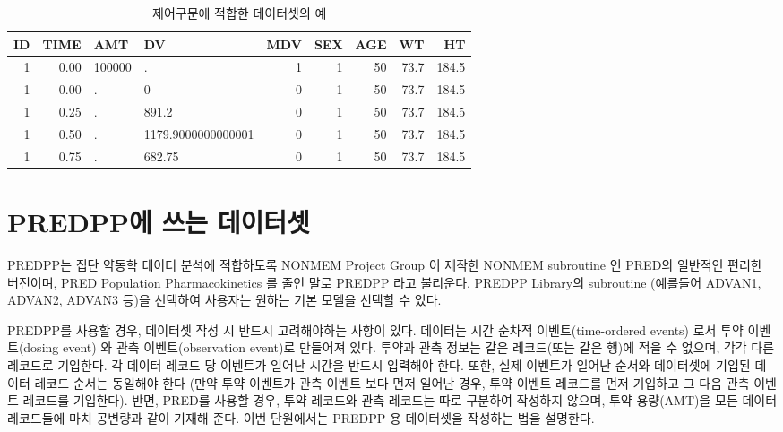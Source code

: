 \documentclass[
  10pt,
]{krantz}
\begin{document}
\begin{table}

\caption{\label{tab:tab}제어구문에 적합한 데이터셋의 예}
\centering
\begin{tabular}[t]{r|r|l|l|r|r|r|r|r}
\hline
ID & TIME & AMT & DV & MDV & SEX & AGE & WT & HT\\
\hline
1 & 0.00 & 100000 & . & 1 & 1 & 50 & 73.7 & 184.5\\
\hline
1 & 0.00 & . & 0 & 0 & 1 & 50 & 73.7 & 184.5\\
\hline
1 & 0.25 & . & 891.2 & 0 & 1 & 50 & 73.7 & 184.5\\
\hline
1 & 0.50 & . & 1179.9000000000001 & 0 & 1 & 50 & 73.7 & 184.5\\
\hline
1 & 0.75 & . & 682.75 & 0 & 1 & 50 & 73.7 & 184.5\\
\hline
\end{tabular}
\end{table}

\hypertarget{predppuxc5d0-uxc4f0uxb294-uxb370uxc774uxd130uxc14b}{%
\section{PREDPP에 쓰는 데이터셋}\label{predppuxc5d0-uxc4f0uxb294-uxb370uxc774uxd130uxc14b}}

PREDPP는 집단 약동학 데이터 분석에 적합하도록 NONMEM Project Group 이 제작한 NONMEM subroutine 인 PRED의 일반적인 편리한 버전이며, PRED Population Pharmacokinetics 를 줄인 말로 PREDPP 라고 불리운다. PREDPP Library의 subroutine (예를들어 ADVAN1, ADVAN2, ADVAN3 등)을 선택하여 사용자는 원하는 기본 모델을 선택할 수 있다.

PREDPP를 사용할 경우, 데이터셋 작성 시 반드시 고려해야하는 사항이 있다. 데이터는 시간 순차적 이벤트(time-ordered events) 로서 투약 이벤트(dosing event) 와 관측 이벤트(observation event)로 만들어져 있다. 투약과 관측 정보는 같은 레코드(또는 같은 행)에 적을 수 없으며, 각각 다른 레코드로 기입한다. 각 데이터 레코드 당 이벤트가 일어난 시간을 반드시 입력해야 한다. 또한, 실제 이벤트가 일어난 순서와 데이터셋에 기입된 데이터 레코드 순서는 동일해야 한다 (만약 투약 이벤트가 관측 이벤트 보다 먼저 일어난 경우, 투약 이벤트 레코드를 먼저 기입하고 그 다음 관측 이벤트 레코드를 기입한다). 반면, PRED를 사용할 경우, 투약 레코드와 관측 레코드는 따로 구분하여 작성하지 않으며, 투약 용량(AMT)을 모든 데이터 레코드들에 마치 공변량과 같이 기재해 준다. 이번 단원에서는 PREDPP 용 데이터셋을 작성하는 법을 설명한다.
\end{document}
